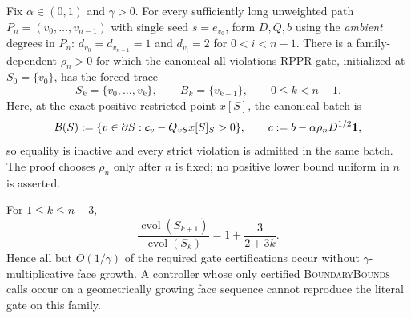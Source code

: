 \begin{proposition}
\label{prop:singleton-path-geometric-sleep-obstruction}
Fix $\alpha\in(0,1)$ and $\gamma>0$.  For every sufficiently long unweighted
path $P_n=(v_0,\ldots,v_{n-1})$ with single seed $s=e_{v_0}$, form $D,Q,b$
using the \emph{ambient} degrees in $P_n$:
$d_{v_0}=d_{v_{n-1}}=1$ and $d_{v_i}=2$ for $0<i<n-1$.
There is a family-dependent $\rho_n>0$ for which the canonical
all-violations RPPR gate, initialized at $S_0=\{v_0\}$, has the forced trace
\begin{equation}
 S_k=\{v_0,\ldots,v_k\},
 \qquad
 B_k=\{v_{k+1}\},
 \qquad 0\leq k<n-1.
 \label{eq:singleton-path-gate-trace}
\end{equation}
Here, at the exact positive restricted point $x[S]$, the canonical batch is
\begin{equation}
 \mathcal B(S)
 :=\{v\in\partial S:
 c_v-Q_{vS}x[S]_S>0\},
 \qquad c:=b-\alpha\rho_nD^{1/2}\mathbf{1},
 \label{eq:singleton-path-canonical-gate}
\end{equation}
so equality is inactive and every strict violation is admitted in the same
batch.  The proof chooses $\rho_n$ only after $n$ is fixed; no positive lower
bound uniform in $n$ is asserted.

For $1\leq k\leq n-3$,
\begin{equation}
 \frac{\operatorname{cvol}(S_{k+1})}
      {\operatorname{cvol}(S_k)}
 =1+\frac{3}{2+3k}.
 \label{eq:singleton-path-volume-ratio}
\end{equation}
Hence all but $O(1/\gamma)$ of the required gate certifications occur without
$\gamma$-multiplicative face growth.  A controller whose only certified
\textsc{BoundaryBounds} calls occur on a geometrically growing face sequence
cannot reproduce the literal gate on this family.


\end{proposition}
